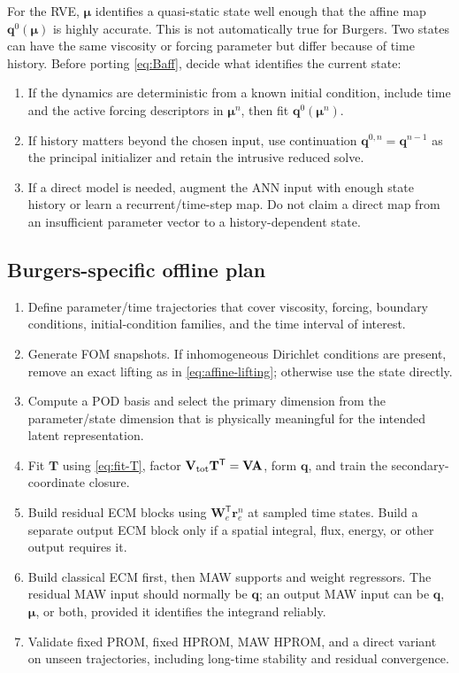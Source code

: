 \documentclass[11pt,a4paper]{article}
\newcommand{\transpose}{^{\mathsf T}}
\newcommand{\vect}[1]{\mathbf{#1}}
\newcommand{\mat}[1]{\mathbf{#1}}
\begin{document}
For the RVE, \(\vect\mu\) identifies a quasi-static state well enough that
the affine map \(\vect q^0(\vect\mu)\) is highly accurate.  This is not
automatically true for Burgers.  Two states can have the same viscosity or
forcing parameter but differ because of time history.  Before porting
\cref{eq:Baff}, decide what identifies the current state:
\begin{enumerate}[label=\arabic*.,leftmargin=8mm]
  \item If the dynamics are deterministic from a known initial condition,
  include time and the active forcing descriptors in \(\vect\mu^n\), then fit
  \(\vect q^0(\vect\mu^n)\).
  \item If history matters beyond the chosen input, use continuation
  \(\vect q^{0,n}=\vect q^{n-1}\) as the principal initializer and retain the
  intrusive reduced solve.
  \item If a direct model is needed, augment the ANN input with enough state
  history or learn a recurrent/time-step map.  Do not claim a direct map from
  an insufficient parameter vector to a history-dependent state.
\end{enumerate}

\subsection{Burgers-specific offline plan}

\begin{enumerate}[label=\arabic*.,leftmargin=8mm]
  \item Define parameter/time trajectories that cover viscosity, forcing,
  boundary conditions, initial-condition families, and the time interval of
  interest.
  \item Generate FOM snapshots.  If inhomogeneous Dirichlet conditions are
  present, remove an exact lifting as in \cref{eq:affine-lifting}; otherwise
  use the state directly.
  \item Compute a POD basis and select the primary dimension from the
  parameter/state dimension that is physically meaningful for the intended
  latent representation.
  \item Fit \(\mat T\) using \cref{eq:fit-T}, factor
  \(\mat V_{\rm tot}\mat T\transpose=\mat V\mat A\), form \(\vect q\), and
  train the secondary-coordinate closure.
  \item Build residual ECM blocks using
  \(\mat W_e\transpose\vect r_e^n\) at sampled time states.  Build a separate
  output ECM block only if a spatial integral, flux, energy, or other output
  requires it.
  \item Build classical ECM first, then MAW supports and weight regressors.
  The residual MAW input should normally be \(\vect q\); an output MAW input
  can be \(\vect q\), \(\vect\mu\), or both, provided it identifies the
  integrand reliably.
  \item Validate fixed PROM, fixed HPROM, MAW HPROM, and a direct variant on
  unseen trajectories, including long-time stability and residual convergence.
\end{enumerate}
\end{document}
